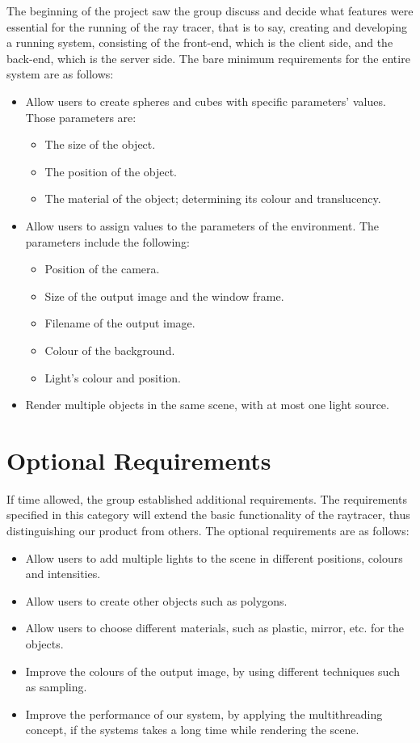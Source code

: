 \documentclass[a4paper]{report}
\begin{document}
	
	The beginning of the project saw the group discuss and decide what features were essential for the running of the ray tracer, that is to say, creating and developing a running system, consisting of the front-end, which is the client side, and the back-end, which is the server side. The bare minimum requirements for the entire system are as follows:
	\begin{itemize}
		\item Allow users to create spheres and cubes with specific parameters' values. Those parameters are:
		\begin{itemize}
			\item The size of the object.
			\item The position of the object.
			\item The material of the object; determining its colour and translucency.
		\end{itemize}
		\item Allow users to assign values to the parameters of the environment. The parameters include the following:
		\begin{itemize}
			\item Position of the camera.
			\item Size of the output image and the window frame.
			\item Filename of the output image.
			\item Colour of the background.
			\item Light's colour and position.
		\end{itemize}
		\item Render multiple objects in the same scene, with at most one light source.
	\end{itemize}
	
	
	\section{Optional Requirements}
	
	If time allowed, the group established additional requirements.
	The requirements specified in this category will extend the basic functionality of the raytracer, thus distinguishing our product from others. The optional requirements are as follows:
	\begin{itemize}
		\item Allow users to add multiple lights to the scene in different positions, colours and intensities.
		\item Allow users to create other objects such as polygons.
		\item Allow users to choose different materials, such as plastic, mirror, etc. for the objects.
		\item Improve the colours of the output image, by using different techniques such as sampling.
		\item Improve the performance of our system, by applying the multithreading concept, if the systems takes a long time while rendering the scene.
	\end{itemize}
	
\end{document}
